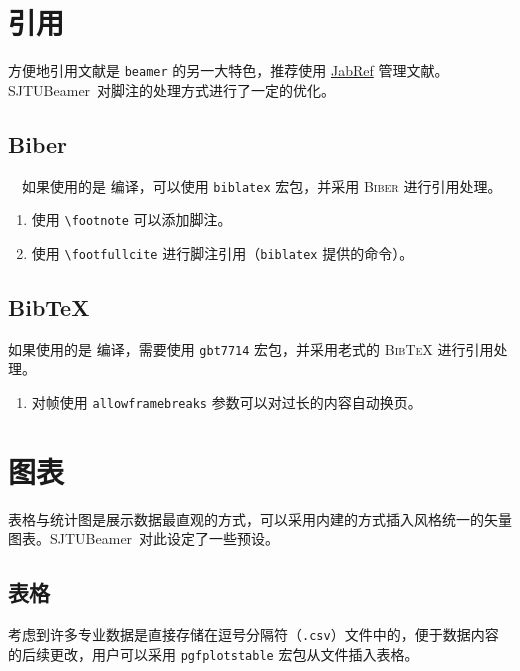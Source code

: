 \documentclass[
    UTF8,
    heading=true,
    12pt,
    a4paper
]{ctexrep}
\newenvironment{commentlist}{\begin{enumerate}\small}{\end{enumerate}}
\def\themename{\textsf{SJTUBeamer}}
\begin{document}
\chapter{引用}

方便地引用文献是 \texttt{beamer} 的另一大特色，推荐使用 \href{https://www.jabref.org/}{JabRef} 管理文献。\themename\ 对脚注的处理方式进行了一定的优化。

\section{Biber}

\faApple\ \faLinux\ 如果使用的是  编译，可以使用 \texttt{biblatex} 宏包，并采用 \textsc{Biber} 进行引用处理。


\begin{commentlist}
  \item 使用 \texttt{\textbackslash{}footnote} 可以添加脚注。
  \item 使用 \texttt{\textbackslash{}footfullcite} 进行脚注引用（\texttt{biblatex} 提供的命令）。
\end{commentlist}

\section{Bib\TeX{}}

\faWindows 如果使用的是  编译，需要使用 \texttt{gbt7714} 宏包，并采用老式的 \textsc{Bib\TeX{}} 进行引用处理。


\begin{commentlist}
  \item 对帧使用 \verb"allowframebreaks" 参数可以对过长的内容自动换页。
\end{commentlist}

\chapter{图表}

表格与统计图是展示数据最直观的方式，可以采用内建的方式插入风格统一的矢量图表。\themename\ 对此设定了一些预设。

\section{表格}

考虑到许多专业数据是直接存储在逗号分隔符（\texttt{.csv}）文件中的，便于数据内容的后续更改，用户可以采用 \texttt{pgfplotstable} 宏包从文件插入表格。
\end{document}
